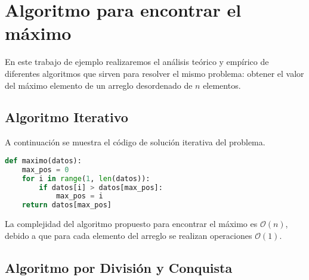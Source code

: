 \section{Algoritmo para encontrar el máximo}

En este trabajo de ejemplo realizaremos el análisis teórico y empírico de diferentes algoritmos que sirven para resolver el mismo problema: obtener el valor del máximo elemento de un arreglo desordenado de $n$ elementos. 

\subsection{Algoritmo Iterativo}

A continuación se muestra el código de solución iterativa del problema. 

\begin{lstlisting}[language=Python]
def maximo(datos):
    max_pos = 0
    for i in range(1, len(datos)):
        if datos[i] > datos[max_pos]:
            max_pos = i
    return datos[max_pos]
\end{lstlisting}


% 




La complejidad del algoritmo propuesto para encontrar el máximo es $\mathcal{O}(n)$, debido a que para cada elemento del arreglo se realizan operaciones $\mathcal{O}(1)$.


\subsection{Algoritmo por División y Conquista}

